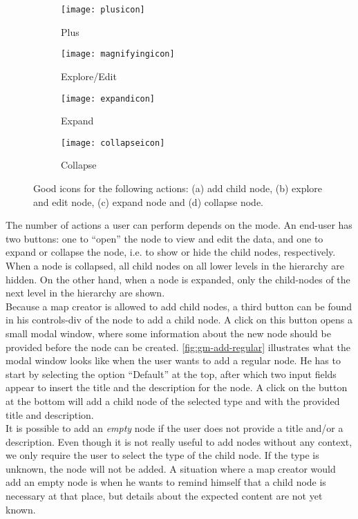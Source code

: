 \begin{figure}[H]
	\centering
	\begin{subfigure}{.2\textwidth}
  		\centering
  		\texttt{[image: plusicon]}
  		\caption{Plus}
  		\label{fig:plusicon}
	\end{subfigure}%
	\begin{subfigure}{.2\textwidth}
  		\centering
  		\texttt{[image: magnifyingicon]}
  		\caption{Explore/Edit}
  		\label{fig:editicon}
	\end{subfigure}
	\begin{subfigure}{.2\textwidth}
		\centering
  		\texttt{[image: expandicon]}
  		\caption{Expand}
  		\label{fig:expandicon}
	\end{subfigure}
	\begin{subfigure}{.2\textwidth}
  		\centering
  		\texttt{[image: collapseicon]}
  		\caption{Collapse}
  		\label{fig:collapseicon}
	\end{subfigure}
	\caption{Good icons for the following actions: (a) add child node, (b) explore and edit node, (c) expand node and (d) collapse node.}
	\label{fig:icons}
\end{figure}

The number of actions a user can perform depends on the mode. An end-user has two buttons: one to ``open'' the node to view and edit the data, and one to expand or collapse the node, i.e. to show or hide the child nodes, respectively. When a node is collapsed, all child nodes on all lower levels in the hierarchy are hidden. On the other hand, when a node is expanded, only the child-nodes of the next level in the hierarchy are shown.\\

Because a map creator is allowed to add child nodes, a third button can be found in his controls-div of the node to add a child node. A click on this button opens a small modal window, where some information about the new node should be provided before the node can be created. \autoref{fig:gm-add-regular} illustrates what the modal window looks like when the user wants to add a regular node. He has to start by selecting the option ``Default'' at the top, after which two input fields appear to insert the title and the description for the node. A click on the button at the bottom will add a child node of the selected type and with the provided title and description.\\

It is possible to add an \textit{empty} node if the user does not provide a title and/or a description. Even though it is not really useful to add nodes without any context, we only require the user to select the type of the child node. If the type is unknown, the node will not be added. A situation where a map creator would add an empty node is when he wants to remind himself that a child node is necessary at that place, but details about the expected content are not yet known.\\


